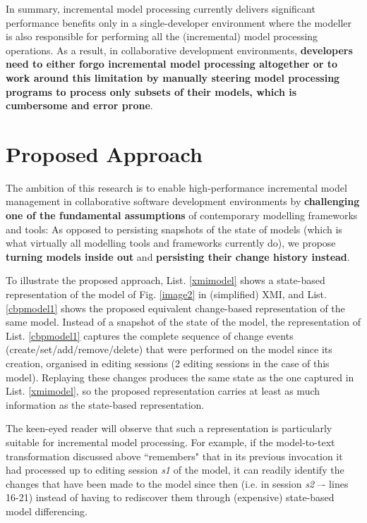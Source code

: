 \documentclass{llncs}
\begin{document}
In summary, incremental model processing currently delivers significant performance benefits only in a single-developer environment where the modeller is also responsible for performing all the (incremental) model processing operations. As a result, in collaborative development environments, \textbf{developers need to either forgo incremental model processing altogether or to work around this limitation by manually steering model processing programs to process only subsets of their models, which is cumbersome and error prone}.

\section{Proposed Approach}
\label{Proposed Approach}
The ambition of this research is to enable high-performance incremental model management in collaborative software development environments by \textbf{challenging one of the fundamental assumptions} of contemporary modelling frameworks and tools: As opposed to persisting snapshots of the state of models (which is what virtually all modelling tools and frameworks currently do), we propose \textbf{turning models inside out} and \textbf{persisting their change history instead}.

To illustrate the proposed approach, List. \ref{xmimodel} shows a state-based representation of the model of Fig. \ref{image2} in (simplified) XMI, and List. \ref{cbpmodel1} shows the proposed equivalent change-based representation of the same model. Instead of a snapshot of the state of the model, the representation of List. \ref{cbpmodel1} captures the complete sequence of change events (create/set/add/remove/delete) that were performed on the model since its creation, organised in editing sessions (2 editing sessions in the case of this model). Replaying these changes produces the same state as the one captured in List. \ref{xmimodel}, so the proposed representation carries at least as much information as the state-based representation.

The keen-eyed reader will observe that such a representation is particularly suitable for incremental model processing. For example, if the model-to-text transformation discussed above ``remembers" that in its previous invocation it had processed up to editing session \emph{s1} of the model, it can readily identify the changes that have been made to the model since then (i.e. in session \emph{s2} –- lines 16-21) instead of having to rediscover them through (expensive) state-based model differencing.
\end{document}

